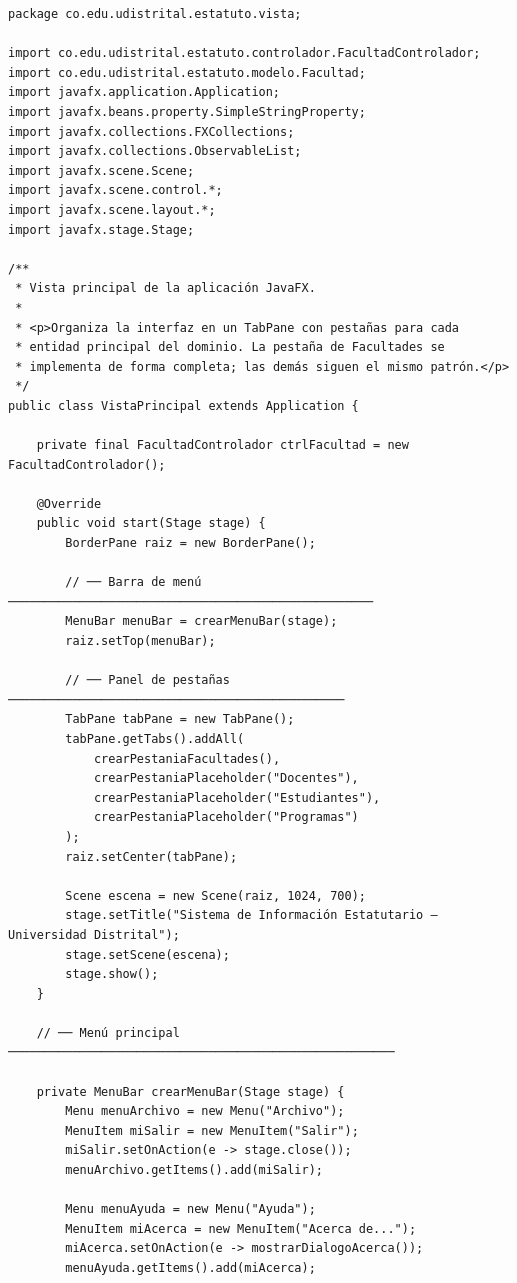 \begin{lstlisting}[style=javaStyle, caption={Vista principal con JavaFX}, label={lst:javafx-vista}]
package co.edu.udistrital.estatuto.vista;

import co.edu.udistrital.estatuto.controlador.FacultadControlador;
import co.edu.udistrital.estatuto.modelo.Facultad;
import javafx.application.Application;
import javafx.beans.property.SimpleStringProperty;
import javafx.collections.FXCollections;
import javafx.collections.ObservableList;
import javafx.scene.Scene;
import javafx.scene.control.*;
import javafx.scene.layout.*;
import javafx.stage.Stage;

/**
 * Vista principal de la aplicación JavaFX.
 *
 * <p>Organiza la interfaz en un TabPane con pestañas para cada
 * entidad principal del dominio. La pestaña de Facultades se
 * implementa de forma completa; las demás siguen el mismo patrón.</p>
 */
public class VistaPrincipal extends Application {

    private final FacultadControlador ctrlFacultad = new FacultadControlador();

    @Override
    public void start(Stage stage) {
        BorderPane raiz = new BorderPane();

        // ── Barra de menú ───────────────────────────────────────────────────
        MenuBar menuBar = crearMenuBar(stage);
        raiz.setTop(menuBar);

        // ── Panel de pestañas ───────────────────────────────────────────────
        TabPane tabPane = new TabPane();
        tabPane.getTabs().addAll(
            crearPestaniaFacultades(),
            crearPestaniaPlaceholder("Docentes"),
            crearPestaniaPlaceholder("Estudiantes"),
            crearPestaniaPlaceholder("Programas")
        );
        raiz.setCenter(tabPane);

        Scene escena = new Scene(raiz, 1024, 700);
        stage.setTitle("Sistema de Información Estatutario — Universidad Distrital");
        stage.setScene(escena);
        stage.show();
    }

    // ── Menú principal ──────────────────────────────────────────────────────

    private MenuBar crearMenuBar(Stage stage) {
        Menu menuArchivo = new Menu("Archivo");
        MenuItem miSalir = new MenuItem("Salir");
        miSalir.setOnAction(e -> stage.close());
        menuArchivo.getItems().add(miSalir);

        Menu menuAyuda = new Menu("Ayuda");
        MenuItem miAcerca = new MenuItem("Acerca de...");
        miAcerca.setOnAction(e -> mostrarDialogoAcerca());
        menuAyuda.getItems().add(miAcerca);


\end{lstlisting}

